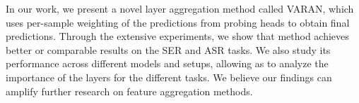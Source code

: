 In our work, we present a novel layer aggregation method called VARAN, which uses per-sample weighting of the predictions from probing heads to obtain final predictions. Through the extensive experiments, we show that \varan method achieves better or comparable results on the SER and ASR tasks. We also study its performance across different models and setups, allowing as to analyze the importance of the layers for the different tasks. We believe our findings can amplify further research on feature aggregation methods.